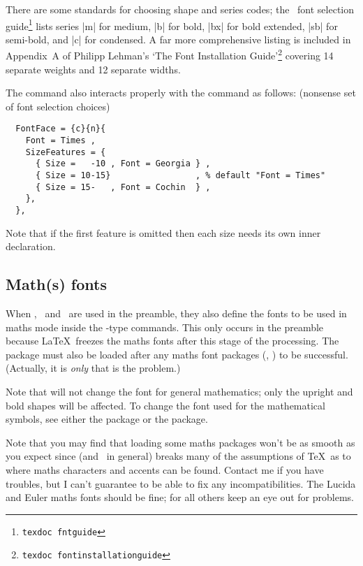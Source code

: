There are some standards for choosing shape and series codes; the \LaTeXe\ font selection guide\footnote{\texttt{texdoc fntguide}} lists series |m| for medium, |b| for bold, |bx| for bold extended, |sb| for semi-bold, and |c| for condensed.
A far more comprehensive listing is included in Appendix~A of Philipp Lehman's `The Font Installation Guide'\footnote{\texttt{texdoc fontinstallationguide}} covering 14 separate weights and 12 separate widths.

The  command also interacts properly with the  command as follows: (nonsense set of font selection choices)
\begin{Verbatim}
  FontFace = {c}{n}{
    Font = Times ,
    SizeFeatures = {
      { Size =   -10 , Font = Georgia } ,
      { Size = 10-15}                 , % default "Font = Times"
      { Size = 15-   , Font = Cochin  } ,
    },
  },
\end{Verbatim}
Note that if the first  feature is omitted then each size needs its own inner  declaration.

\subsection{Math(s) fonts}

When \cmd\setmainfont, \cmd\setsansfont\ and \cmd\setmonofont\ are used in the
preamble, they also define the fonts to be used in maths mode inside the
\cmd\mathrm-type commands. This only occurs in the preamble because \LaTeX\
freezes the maths fonts after this stage of the processing. The 
package must also be loaded after any maths font packages (\eg, )
to be successful. (Actually, it is \emph{only} \pkg{euler} that is the
problem.)

Note that  will not change the font for general mathematics;
only the upright and bold shapes will be affected.
To change the font used for the mathematical symbols, see either the
\pkg{mathspec} package or the \pkg{unicode-math} package.

Note that you may find that loading some maths packages won't be as smooth as
you expect since \pkg{fontspec} (and \XeTeX\ in general) breaks many of the
assumptions of \TeX\ as to where maths characters and accents can be found.
Contact me if you have troubles, but I can't guarantee to be able to fix any
incompatibilities. The Lucida and Euler maths fonts should be fine; for all
others keep an eye out for problems.

